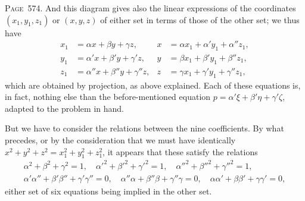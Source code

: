 \documentclass[11pt,a4paper]{article}
\theoremstyle{definition}
\begin{document}
\newpage
\noindent\textsc{Page~574.} And this diagram gives also the linear expressions of the coordinates $(x_1,y_1,z_1)$ or $(x,y,z)$ of either set in terms of those of the other set; we thus have
\begin{align*}
x_1 &= \alpha x + \beta y + \gamma z, & x &= \alpha x_1 + \alpha' y_1 + \alpha'' z_1,\\
y_1 &= \alpha' x + \beta' y + \gamma' z, & y &= \beta x_1 + \beta' y_1 + \beta'' z_1,\\
z_1 &= \alpha'' x + \beta'' y + \gamma'' z, & z &= \gamma x_1 + \gamma' y_1 + \gamma'' z_1,
\end{align*}
which are obtained by projection, as above explained. Each of these equations is, in fact, nothing else than the before-mentioned equation $p=\alpha'\xi+\beta'\eta+\gamma'\zeta$, adapted to the problem in hand.

But we have to consider the relations between the nine coefficients. By what precedes, or by the consideration that we must have identically $x^2+y^2+z^2=x_1^2+y_1^2+z_1^2$, it appears that these satisfy the relations
\begin{gather*}
\alpha^2+\beta^2+\gamma^2=1,\quad \alpha'^2+\beta'^2+\gamma'^2=1,\quad \alpha''^2+\beta''^2+\gamma''^2=1,\\
\alpha'\alpha''+\beta'\beta''+\gamma'\gamma''=0,\quad
\alpha''\alpha+\beta''\beta+\gamma''\gamma=0,\quad
\alpha\alpha'+\beta\beta'+\gamma\gamma'=0,
\end{gather*}
either set of six equations being implied in the other set.
\end{document}
